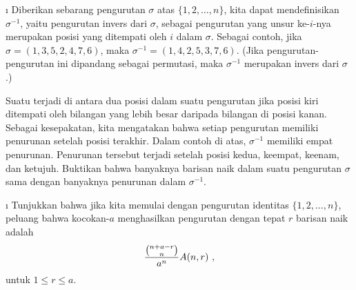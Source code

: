 \exercises
\begin{LJSItem}
\i\label{exer 3.3.1} Diberikan sebarang pengurutan $\sigma$ atas $\{1, 2, \ldots, n\}$,
kita dapat mendefinisikan $\sigma^{-1}$, yaitu pengurutan invers dari $\sigma$, sebagai
pengurutan yang unsur ke-$i$-nya merupakan posisi yang ditempati oleh $i$ dalam $\sigma$.
Sebagai contoh, jika $\sigma = (1, 3, 5, 2, 4, 7, 6)$, maka $\sigma^{-1} = (1, 4, 2, 5,
3, 7, 6)$.  (Jika pengurutan-pengurutan ini dipandang sebagai permutasi, maka
$\sigma^{-1}$ merupakan invers dari $\sigma$.)
\par Suatu  terjadi di antara dua posisi dalam suatu
pengurutan jika posisi kiri ditempati oleh bilangan yang lebih besar daripada bilangan
di posisi kanan.  Sebagai kesepakatan, kita mengatakan bahwa setiap pengurutan memiliki
penurunan setelah posisi terakhir.  Dalam contoh di atas, $\sigma^{-1}$ memiliki empat
penurunan.  Penurunan tersebut terjadi setelah posisi kedua, keempat, keenam, dan ketujuh.
Buktikan bahwa banyaknya barisan naik dalam suatu pengurutan $\sigma$ sama dengan banyaknya
penurunan dalam $\sigma^{-1}$.

\i\label{exer 3.3.2} Tunjukkan bahwa jika kita memulai dengan pengurutan identitas
$\{1, 2, \ldots, n\}$, peluang bahwa kocokan-$a$ menghasilkan pengurutan dengan tepat
$r$ barisan naik adalah
$${{{n + a - r}\choose{n}}\over{a^n}}A(n, r)\ ,$$ untuk $1 \le r \le a$.


\end{LJSItem}
